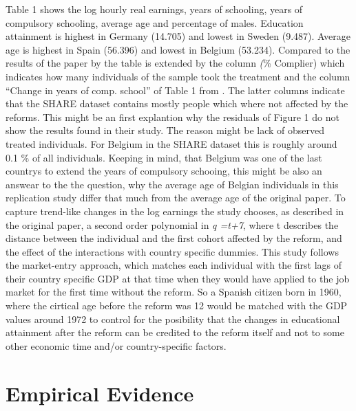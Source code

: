 \documentclass[12pt,a4paper]{article}
\begin{document}
Table 1 shows the log hourly real earnings, years of schooling, years of
compulsory schooling, average age and percentage of males. Education
attainment is highest in Germany (14.705) and lowest in Sweden (9.487).
Average age is highest in Spain (56.396) and lowest in Belgium (53.234).
Compared to the results of the paper by \textcite{brunello} the table is
extended by the column \textit(\% Complier) which indicates how many
individuals of the sample took the treatment and the column
\enquote{Change in years of comp. school} of Table 1 from
\textcite{brunello}. The latter columns indicate that the SHARE dataset
contains mostly people which where not affected by the reforms. This
might be an first explantion why the residuals of Figure 1 do not show
the results \textcite{brunello} found in their study. The reason might
be lack of observed treated individuals. For Belgium in the SHARE
dataset this is roughly around 0.1 \% of all individuals. Keeping in
mind, that Belgium was one of the last countrys to extend the years of
compulsory schooing, this might be also an answear to the the question,
why the average age of Belgian individuals in this replication study
differ that much from the average age of the original paper. To capture
trend-like changes in the log earnings the study chooses, as described
in the original paper, a second order polynomial in \textit{q =t+7},
where t describes the distance between the individual and the first
cohort affected by the reform, and the effect of the interactions with
country specific dummies. This study follows the market-entry approach,
which matches each individual with the first lags of their country
specific GDP at that time when they would have applied to the job market
for the first time without the reform. So a Spanish citizen born in
1960, where the cirtical age before the reform was 12 would be matched
with the GDP values around 1972 to control for the posibility that the
changes in educational attainment after the reform can be credited to
the reform itself and not to some other economic time and/or
country-specific factors.

\hypertarget{empirical-evidence}{%
\section{Empirical Evidence}\label{empirical-evidence}}
\end{document}
